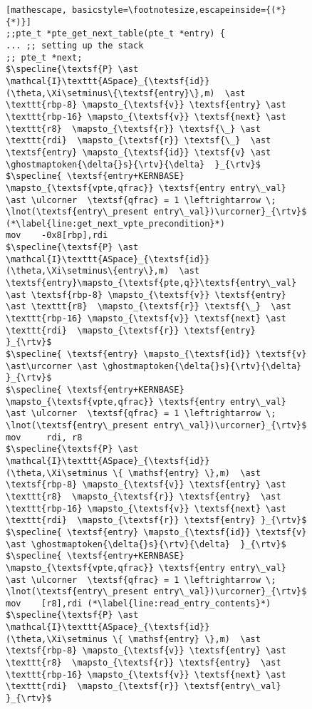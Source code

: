 \begin{figure}%
\begin{lstlisting}[mathescape, basicstyle=\footnotesize,escapeinside={(*}{*)}]
;;pte_t *pte_get_next_table(pte_t *entry) {
... ;; setting up the stack
;; pte_t *next;
$\specline{\textsf{P} \ast \mathcal{I}\texttt{ASpace}_{\textsf{id}}(\theta,\Xi\setminus\{\textsf{entry}\},m)  \ast \texttt{rbp-8} \mapsto_{\textsf{v}} \textsf{entry} \ast  \texttt{rbp-16} \mapsto_{\textsf{v}} \textsf{next} \ast \texttt{r8}  \mapsto_{\textsf{r}} \textsf{\_} \ast \texttt{rdi}  \mapsto_{\textsf{r}} \textsf{\_}  \ast \textsf{entry} \mapsto_{\textsf{id}} \textsf{v} \ast \ghostmaptoken{\delta{}s}{\rtv}{\delta}  }_{\rtv}$
$\specline{ \textsf{entry+KERNBASE} \mapsto_{\textsf{vpte,qfrac}} \textsf{entry entry\_val} \ast \ulcorner  \textsf{qfrac} = 1 \leftrightarrow \; \lnot(\textsf{entry\_present entry\_val})\urcorner}_{\rtv}$ (*\label{line:get_next_vpte_precondition}*)
mov    -0x8[rbp],rdi
$\specline{\textsf{P} \ast \mathcal{I}\texttt{ASpace}_{\textsf{id}}(\theta,\Xi\setminus\{entry\},m)  \ast \textsf{entry}\mapsto_{\textsf{pte,q}}\textsf{entry\_val} \ast \textsf{rbp-8} \mapsto_{\textsf{v}} \textsf{entry} \ast \texttt{r8}  \mapsto_{\textsf{r}} \textsf{\_}  \ast  \texttt{rbp-16} \mapsto_{\textsf{v}} \textsf{next} \ast \texttt{rdi}  \mapsto_{\textsf{r}} \textsf{entry}  }_{\rtv}$
$\specline{ \textsf{entry} \mapsto_{\textsf{id}} \textsf{v} \ast\urcorner \ast \ghostmaptoken{\delta{}s}{\rtv}{\delta}  }_{\rtv}$
$\specline{ \textsf{entry+KERNBASE} \mapsto_{\textsf{vpte,qfrac}} \textsf{entry entry\_val} \ast \ulcorner  \textsf{qfrac} = 1 \leftrightarrow \; \lnot(\textsf{entry\_present entry\_val})\urcorner}_{\rtv}$
mov     rdi, r8
$\specline{\textsf{P} \ast \mathcal{I}\texttt{ASpace}_{\textsf{id}}(\theta,\Xi\setminus \{ \mathsf{entry} \},m)  \ast \textsf{rbp-8} \mapsto_{\textsf{v}} \textsf{entry} \ast \texttt{r8}  \mapsto_{\textsf{r}} \textsf{entry}  \ast  \texttt{rbp-16} \mapsto_{\textsf{v}} \textsf{next} \ast \texttt{rdi}  \mapsto_{\textsf{r}} \textsf{entry} }_{\rtv}$
$\specline{ \textsf{entry} \mapsto_{\textsf{id}} \textsf{v} \ast \ghostmaptoken{\delta{}s}{\rtv}{\delta}  }_{\rtv}$
$\specline{ \textsf{entry+KERNBASE} \mapsto_{\textsf{vpte,qfrac}} \textsf{entry entry\_val} \ast \ulcorner  \textsf{qfrac} = 1 \leftrightarrow \; \lnot(\textsf{entry\_present entry\_val})\urcorner}_{\rtv}$
mov    [r8],rdi (*\label{line:read_entry_contents}*)
$\specline{\textsf{P} \ast \mathcal{I}\texttt{ASpace}_{\textsf{id}}(\theta,\Xi\setminus \{ \mathsf{entry} \},m)  \ast \textsf{rbp-8} \mapsto_{\textsf{v}} \textsf{entry} \ast \texttt{r8}  \mapsto_{\textsf{r}} \textsf{entry}  \ast  \texttt{rbp-16} \mapsto_{\textsf{v}} \textsf{next} \ast \texttt{rdi}  \mapsto_{\textsf{r}} \textsf{entry\_val}   }_{\rtv}$

\end{lstlisting}
\end{figure}

